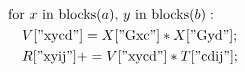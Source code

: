 \documentclass{standalone}
\begin{document}
\begin{equation*}
\begin{aligned}
	&\textrm{for } x \textrm{ in blocks(}a \textrm{), }y \textrm{ in blocks(} b \textrm{)}:\\
	&\quad V["\textrm{xycd}"] = X["\textrm{Gxc}"] * X["\textrm{Gyd}"];  \\
	&\quad R["\textrm{xyij}"] += V["\textrm{xycd}"] * T["\textrm{cdij}"];
\end{aligned}
\end{equation*}
\end{document}

